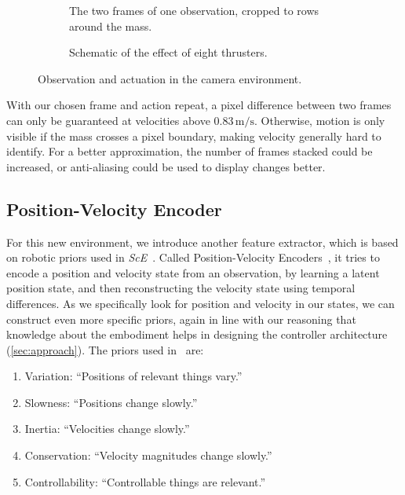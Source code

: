 \begin{figure}[htbp]
    \centering
    \begin{subfigure}[b]{0.49\linewidth}
        \centering
        \caption{The two frames of one observation, cropped to rows around the mass.}
        \label{fig:pixel-setup-observation}
    \end{subfigure}\hfill
    \begin{subfigure}[b]{0.49\linewidth}
        \centering
        
        \caption{Schematic of the effect of eight thrusters.}
        \label{fig:pixel-setup-thrusters}
    \end{subfigure}
    \caption{Observation and actuation in the camera environment.}
    \label{fig:pixel-setup}
\end{figure}

With our chosen frame and action repeat, a pixel difference between two frames can only be guaranteed at velocities
above $0.83\,\mathrm{m/s}$. Otherwise, motion is only visible if the mass crosses a pixel boundary, making velocity
generally hard to identify. For a better approximation, the number of frames stacked could be increased,
or anti-aliasing could be used to display changes better.

\subsection{Position-Velocity Encoder}
\label{subsec:pve}

For this new environment, we introduce another feature extractor, which is based on robotic priors used
in \emph{ScE}~\cite{Jonschkowski2015Learning,Botteghi2021LowDimensional}. Called Position-Velocity Encoders~\cite{Jonschkowski2017PVE},
it tries to encode a position and velocity state from an observation, by learning a latent position state, and then
reconstructing the velocity state using temporal differences. As we specifically look for position and velocity in our
states, we can construct even more specific priors, again in line with our reasoning that knowledge about the embodiment
helps in designing the controller architecture (\cref{sec:approach}). The priors used in~\cite[Sec.~III-B]{Jonschkowski2017PVE} are:
\begin{enumerate}
    \item Variation: ``Positions of relevant things vary.''
    \item Slowness: ``Positions change slowly.''
    \item Inertia: ``Velocities change slowly.''
    \item Conservation: ``Velocity magnitudes change slowly.''
    \item Controllability: ``Controllable things are relevant.''
\end{enumerate}

